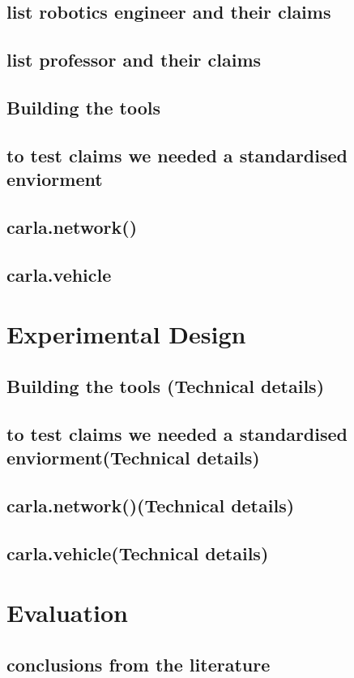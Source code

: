 \documentclass[conference]{IEEEtran}
\begin{document}
\subsection{list robotics engineer and their claims}
\subsection{list professor and their claims}
\subsection{Building the tools}
\subsection{to test claims we needed a standardised enviorment}
\subsection{carla.network()}
\subsection{carla.vehicle}




\section{Experimental Design}
\subsection{Building the tools (Technical details)}
\subsection{to test claims we needed a standardised enviorment(Technical details)}
\subsection{carla.network()(Technical details)}
\subsection{carla.vehicle(Technical details)}

\section{Evaluation}
\subsection{conclusions from the literature}
\end{document}

